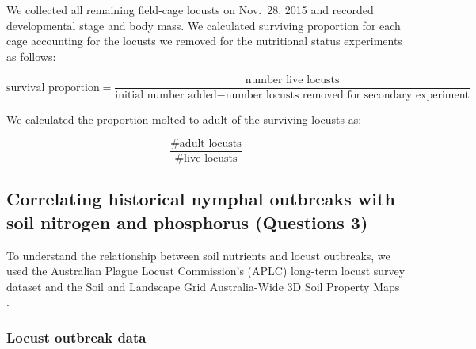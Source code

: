 \documentclass[
]{article}
\begin{document}
We collected all remaining field-cage locusts on Nov.~28, 2015 and
recorded developmental stage and body mass. We calculated surviving
proportion for each cage accounting for the locusts we removed for the
nutritional status experiments as follows:

\[
\text{survival proportion} = \frac{\text{number live locusts}}{\text{initial number added} - \text{number locusts removed for secondary experiment}}
\]

We calculated the proportion molted to adult of the surviving locusts
as:

\[
\frac{\text{\# adult locusts}}{\text{\# live locusts}}
\]

\subsection{Correlating historical nymphal outbreaks with soil nitrogen
and phosphorus (Questions
3)}\label{correlating-historical-nymphal-outbreaks-with-soil-nitrogen-and-phosphorus-questions-3}

To understand the relationship between soil nutrients and locust
outbreaks, we used the Australian Plague Locust Commission's (APLC)
long-term locust survey dataset \citep{deveson_operation_2002} and the
Soil and Landscape Grid Australia-Wide 3D Soil Property Maps
\citep{grundy_soil_2015}.

\subsubsection{Locust outbreak data}\label{locust-outbreak-data}
\end{document}
